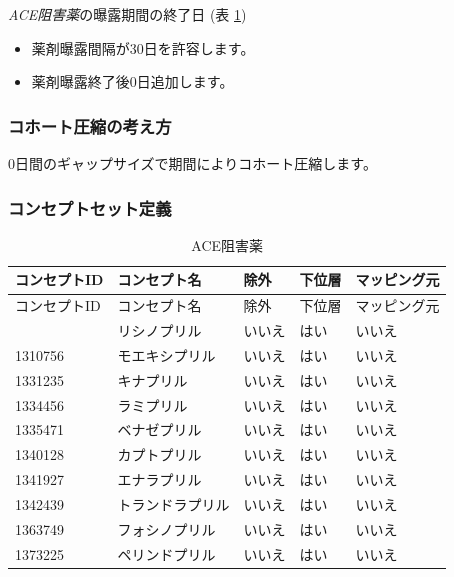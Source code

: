 \documentclass[
  11pt]{book}
\providecommand{\tightlist}{%
  \setlength{\itemsep}{0pt}\setlength{\parskip}{0pt}}
\theoremstyle{definition}
\theoremstyle{definition}
\theoremstyle{definition}
\theoremstyle{definition}
\theoremstyle{remark}
\begin{document}
\emph{ACE阻害薬}の曝露期間の終了日 (表 \ref{tab:aceInhibitorsMono})

\begin{itemize}
\tightlist
\item
  薬剤曝露間隔が30日を許容します。
\item
  薬剤曝露終了後0日追加します。
\end{itemize}

\subsubsection*{コホート圧縮の考え方}\label{ux30b3ux30dbux30fcux30c8ux5727ux7e2eux306eux8003ux3048ux65b9-1}

0日間のギャップサイズで期間によりコホート圧縮します。

\subsubsection*{コンセプトセット定義}\label{ux30b3ux30f3ux30bbux30d7ux30c8ux30bbux30c3ux30c8ux5b9aux7fa9-1}

\begin{longtable}[]{@{}lllll@{}}
\caption{\label{tab:aceInhibitorsMono} ACE阻害薬}\tabularnewline
\toprule\noalign{}
コンセプトID & コンセプト名 & 除外 & 下位層 & マッピング元 \\
\midrule\noalign{}
\endfirsthead
\toprule\noalign{}
コンセプトID & コンセプト名 & 除外 & 下位層 & マッピング元 \\
\midrule\noalign{}
\endhead
\bottomrule\noalign{}
\endlastfoot
1308216 & リシノプリル & いいえ & はい & いいえ \\
1310756 & モエキシプリル & いいえ & はい & いいえ \\
1331235 & キナプリル & いいえ & はい & いいえ \\
1334456 & ラミプリル & いいえ & はい & いいえ \\
1335471 & ベナゼプリル & いいえ & はい & いいえ \\
1340128 & カプトプリル & いいえ & はい & いいえ \\
1341927 & エナラプリル & いいえ & はい & いいえ \\
1342439 & トランドラプリル & いいえ & はい & いいえ \\
1363749 & フォシノプリル & いいえ & はい & いいえ \\
1373225 & ペリンドプリル & いいえ & はい & いいえ \\
\end{longtable}
\end{document}

